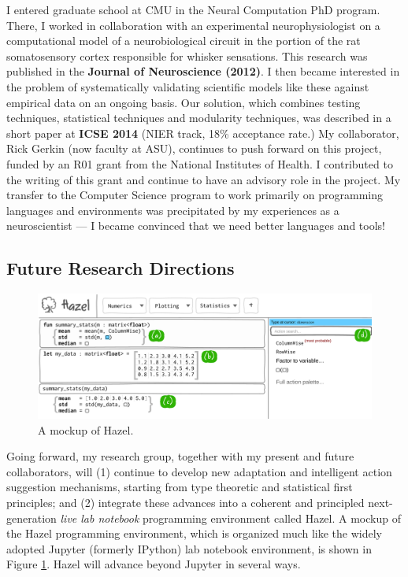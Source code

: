 \documentclass[10pt]{article}
\begin{document}
I entered graduate school at CMU in the Neural Computation PhD program. There, I worked in collaboration with an experimental neurophysiologist on a computational model of a neurobiological circuit in the portion of the rat somatosensory cortex responsible for whisker sensations. This research was published in the \textbf{Journal of Neuroscience (2012)}. I then became interested in the problem of systematically validating scientific models like these against empirical data on an ongoing basis. Our solution, which combines testing techniques, statistical techniques and modularity techniques, was described in a short paper at \textbf{ICSE 2014} (NIER track, 18\% acceptance rate.) My collaborator, Rick Gerkin (now faculty at ASU), continues to push forward on this project, funded by an R01 grant from the National Institutes of Health. I contributed to the writing of this grant and continue to have an advisory role in the project. My transfer to the Computer Science program to work primarily on programming languages and environments was precipitated by my experiences as a neuroscientist --- I became convinced that we need better languages and tools!



\subsection*{Future Research Directions}
\begin{figure}
\vspace{-1.5ex}
\includegraphics[width=\textwidth]{mockup-1}
\vspace{-4ex}
\caption{A mockup of Hazel.}
\label{fig:hazel-mockup}
\vspace{-2ex}
\end{figure}

Going forward, my research group, together with my present and future collaborators, will (1) continue to develop new adaptation and intelligent action suggestion mechanisms, starting from type theoretic and statistical first principles; and (2) integrate these advances into a coherent and principled next-generation \emph{live lab notebook} programming environment called Hazel. A mockup of the Hazel programming environment, which is organized much like the widely adopted Jupyter (formerly IPython) lab notebook environment, is shown in Figure \ref{fig:hazel-mockup}. Hazel will advance beyond Jupyter in several ways. 
\end{document}

